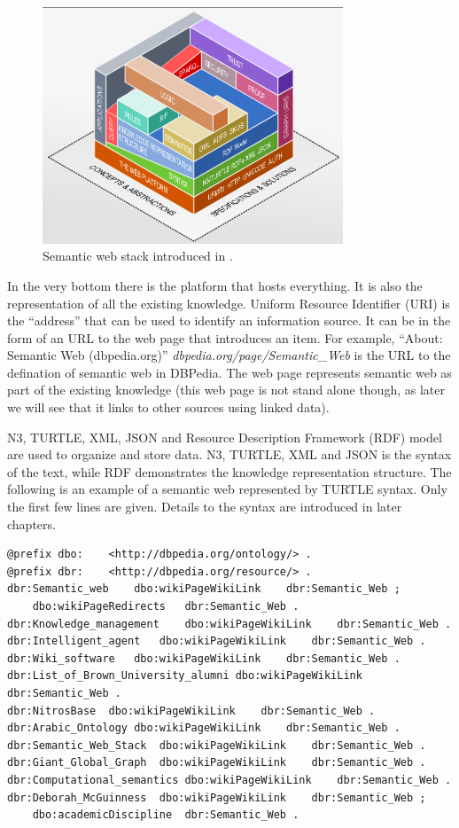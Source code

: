\begin{figure}[htbp]
	\centering
	\includegraphics[width=0.8\textwidth]{./chapters/ch-semanticwebbasics/figures/semanticwebstack.png}
	\caption{Semantic web stack introduced in \cite{semanticwebstack}.}
	\label{fig:semanticwebstack}
\end{figure}

In the very bottom there is the platform that hosts everything. It is also the representation of all the existing knowledge. Uniform Resource Identifier (URI) is the “address” that can be used to identify an information source. It can be in the form of an URL to the web page that introduces an item. For example, ``About: Semantic Web (dbpedia.org)'' \textit{dbpedia.org/page/Semantic_Web} is the URL to the defination of semantic web in DBPedia. The web page represents semantic web as part of the existing knowledge (this web page is not stand alone though, as later we will see that it links to other sources using linked data).

N3, TURTLE, XML, JSON and Resource Description Framework (RDF) model are used to organize and store data. N3, TURTLE, XML and JSON is the syntax of the text, while RDF demonstrates the knowledge representation structure. The following is an example of a semantic web represented by TURTLE syntax. Only the first few lines are given. Details to the syntax are introduced in later chapters.

\begin{lstlisting}
@prefix dbo:	<http://dbpedia.org/ontology/> .
@prefix dbr:	<http://dbpedia.org/resource/> .
dbr:Semantic_web	dbo:wikiPageWikiLink	dbr:Semantic_Web ;
	dbo:wikiPageRedirects	dbr:Semantic_Web .
dbr:Knowledge_management	dbo:wikiPageWikiLink	dbr:Semantic_Web .
dbr:Intelligent_agent	dbo:wikiPageWikiLink	dbr:Semantic_Web .
dbr:Wiki_software	dbo:wikiPageWikiLink	dbr:Semantic_Web .
dbr:List_of_Brown_University_alumni	dbo:wikiPageWikiLink	dbr:Semantic_Web .
dbr:NitrosBase	dbo:wikiPageWikiLink	dbr:Semantic_Web .
dbr:Arabic_Ontology	dbo:wikiPageWikiLink	dbr:Semantic_Web .
dbr:Semantic_Web_Stack	dbo:wikiPageWikiLink	dbr:Semantic_Web .
dbr:Giant_Global_Graph	dbo:wikiPageWikiLink	dbr:Semantic_Web .
dbr:Computational_semantics	dbo:wikiPageWikiLink	dbr:Semantic_Web .
dbr:Deborah_McGuinness	dbo:wikiPageWikiLink	dbr:Semantic_Web ;
	dbo:academicDiscipline	dbr:Semantic_Web .
\end{lstlisting}

